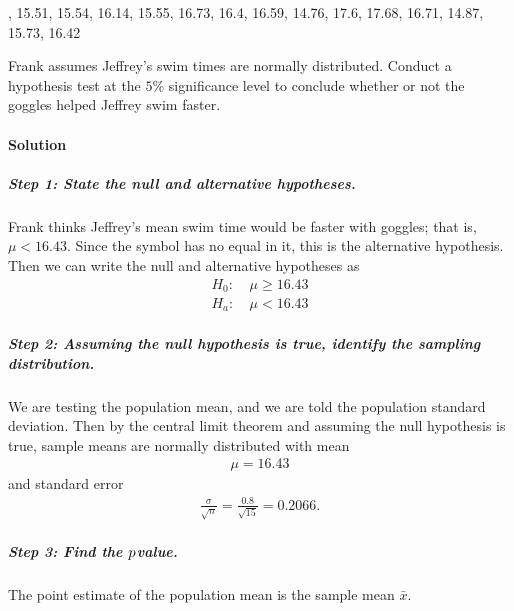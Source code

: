 \documentclass[letterpaper,10pt,english]{jupyterBook}
\begin{document}
, 15.51, 15.54, 16.14, 15.55, 16.73, 16.4, 16.59, 14.76, 17.6, 17.68, 16.71, 14.87, 15.73, 16.42

\sphinxAtStartPar
Frank assumes Jeffrey’s swim times are normally distributed. Conduct a hypothesis test at the \(5\%\) significance level to conclude whether or not the goggles helped Jeffrey swim faster.


\paragraph{Solution}
\label{\detokenize{Ch6 An Introduction to Hypothesis Testing/6.4 Hypothesis Tests of One Population:id3}}

\subparagraph{Step 1: State the null and alternative hypotheses.}
\label{\detokenize{Ch6 An Introduction to Hypothesis Testing/6.4 Hypothesis Tests of One Population:step-1-state-the-null-and-alternative-hypotheses}}
\sphinxAtStartPar
Frank thinks Jeffrey’s mean swim time would be faster with goggles; that is, \(\mu < 16.43\). Since the symbol has no equal in it, this is the alternative hypothesis. Then we can write the null and alternative hypotheses as
\begin{align*}
H_0:&\ \mu \geq 16.43 \\
H_a:&\ \mu < 16.43
\end{align*}

\subparagraph{Step 2: Assuming the null hypothesis is true, identify the sampling distribution.}
\label{\detokenize{Ch6 An Introduction to Hypothesis Testing/6.4 Hypothesis Tests of One Population:step-2-assuming-the-null-hypothesis-is-true-identify-the-sampling-distribution}}
\sphinxAtStartPar
We are testing the population mean, and we are told the population standard deviation. Then by the central limit theorem and assuming the null hypothesis is true, sample means are normally distributed with mean
\begin{equation*}
\begin{split} \mu = 16.43 \end{split}
\end{equation*}
\sphinxAtStartPar
and standard error
\begin{equation*}
\begin{split} \frac{\sigma}{\sqrt{n}} = \frac{0.8}{\sqrt{15}} = 0.2066. \end{split}
\end{equation*}

\subparagraph{Step 3: Find the  \protect\(p\protect\)\sphinxhyphen{}value.}
\label{\detokenize{Ch6 An Introduction to Hypothesis Testing/6.4 Hypothesis Tests of One Population:step-3-find-the-p-value}}
\sphinxAtStartPar
The point estimate of the population mean is the sample mean \(\bar{x}\).
\end{document}
